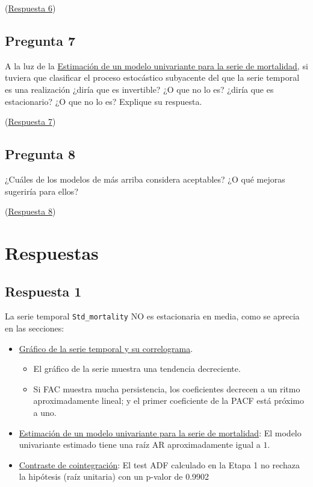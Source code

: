 \documentclass[10pt]{article}
\begin{document}
(\hyperref[sec:org3869369]{Respuesta 6})
\subsection*{Pregunta 7}
\label{sec:orgc06d639}

A la luz de la \hyperref[sec:org479a248]{Estimación de un modelo univariante para la serie de mortalidad}, si tuviera que clasificar el proceso estocástico
subyacente del que la serie temporal es una realización ¿diría que es
invertible?  ¿O que no lo es?  ¿diría que es estacionario? ¿O que no
lo es? Explique su respuesta.

(\hyperref[sec:orgaa45764]{Respuesta 7})
\subsection*{Pregunta 8}
\label{sec:orga6067c5}

¿Cuáles de los modelos de más arriba considera aceptables? ¿O qué
mejoras sugeriría para ellos?

(\hyperref[sec:org2b451dd]{Respuesta 8})

\newpage
\section*{Respuestas}
\label{sec:orgeba3e6a}

\subsection*{Respuesta 1}
\label{sec:org51d1aa2}

La serie temporal \texttt{Std\_mortality} NO es estacionaria en media, como se
aprecia en las secciones:
\begin{itemize}
\item \hyperref[sec:org2501914]{Gráfico de la serie temporal y su correlograma}. 
\begin{itemize}
\item El gráfico de la serie muestra una tendencia decreciente.
\item Si FAC muestra mucha persistencia, los coeficientes decrecen a un
ritmo aproximadamente lineal; y el primer coeficiente de la PACF
está próximo a uno.
\end{itemize}
\item \hyperref[sec:org479a248]{Estimación de un modelo univariante para la serie de mortalidad}: El
modelo univariante estimado tiene una raíz AR aproximadamente igual
a \(1\).
\item \hyperref[sec:org7b924cb]{Contraste de cointegración}: El test ADF calculado en la Etapa 1 no
rechaza la hipótesis (raíz unitaria) con un p-valor de 0.9902
\end{itemize}
\end{document}

